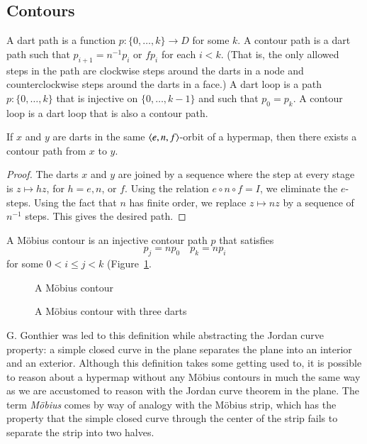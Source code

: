 \subsection{Contours}

\begin{definition}  A dart path is a function $p:\{0,\ldots,k\}\to D$
for some $k$.  A contour path is a dart path such that $p_{i+1} =
n^{-1} p_i$ or $f p_i$ for each $i<k$.  (That is, the only allowed
steps in the path are clockwise steps around the darts in a node and
counterclockwise steps around the darts in a face.)  A dart loop is
a path $p:\{0,\ldots,k\}$ that is injective on $\{0,\ldots,k-1\}$
and such that $p_0 = p_k$.  A contour loop is a dart loop that is
also a contour path.
\end{definition}

\begin{lemma}\label{lemma:connect-contour}  If $x$ and $y$ are darts
in the same $\langle e,n,f\rangle$-orbit of a hypermap, then there exists
a contour path from $x$ to $y$.
\end{lemma}

\begin{proof} 
The darts
$x$ and $y$ are joined by a sequence where the step at every stage
is $z\mapsto h z$, for $h=e,n$, or $f$.  Using the relation $e\circ
n\circ f = I$, we eliminate the $e$-steps. Using the fact that $n$
has finite order, we replace $z \mapsto n z$ by a sequence
of $n^{-1}$ steps.  This gives the desired path.
\end{proof}

\begin{definition} A M\"obius contour is an
injective contour path $p$ that satisfies
    \begin{equation}
    \label{eqn:mobius}
    p_j = n p_0\quad p_k = n p_i
    \end{equation}
for some $0 < i\le j< k$ (Figure~\ref{fig:mobius}.
\end{definition}

\begin{figure}[htb]
  \centering
  \caption{A M\"obius contour}
  \label{fig:mobius}
\end{figure}

\begin{figure}[htb]
  \centering
  \caption{A M\"obius contour with three darts}
  \label{fig:3m}
\end{figure}


\begin{remark}
 G. Gonthier was led to
this definition while abstracting the Jordan curve property: a
simple closed curve in the plane separates the plane into an
interior and an exterior.  Although this definition takes some getting used to,
it is possible to reason about a hypermap without any M\"obius contours in
much the same way as we are accustomed to reason with the Jordan curve theorem
in the plane.
The term {\it M\"obius} comes by way of
analogy with the M\"obius strip, which has the property that the
simple closed curve through the center of the strip fails to
separate the strip into two halves.
\end{remark}



